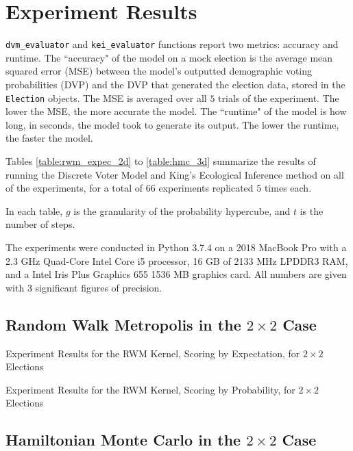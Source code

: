 \FloatBarrier
\section{Experiment Results}
\label{sec:exper_results}

 \texttt{dvm\_evaluator} and \texttt{kei\_evaluator} functions report two metrics: accuracy and runtime. The ``accuracy" of the model on a mock election is the average mean squared error (MSE) between the model's outputted demographic voting probabilities (DVP) and the DVP that generated the election data, stored in the \texttt{Election} objects. The MSE is averaged over all $5$ trials of the experiment. The lower the MSE, the more accurate the model. The ``runtime" of the model is how long, in seconds, the model took to generate its output. The lower the runtime, the faster the model.

Tables \ref{table:rwm_expec_2d} to \ref{table:hmc_3d} summarize the results of running the Discrete Voter Model and King's Ecological Inference method on all of the experiments, for a total of $66$ experiments replicated $5$ times each.

In each table, $g$ is the granularity of the probability hypercube, and $t$ is the number of steps.

The experiments were conducted in Python 3.7.4 on a 2018 MacBook Pro with a 2.3 GHz Quad-Core Intel Core i5 processor, 16 GB of 2133 MHz LPDDR3 RAM, and a Intel Iris Plus Graphics 655 1536 MB graphics card. All numbers are given with $3$ significant figures of precision.

\subsection{Random Walk Metropolis in the $2 \times 2$ Case}

\begin{table}[ht]
  \centering
  \caption{Experiment Results for the RWM Kernel, Scoring by Expectation, for $2 \times 2$ Elections}
  \label{table:rwm_expec_2d}
  
\end{table}


\begin{table}[ht]
  \centering
  \caption{Experiment Results for the RWM Kernel, Scoring by Probability, for $2 \times 2$ Elections}
  \label{table:rwm_prob_2d}
  
\end{table}


\FloatBarrier
\subsection{Hamiltonian Monte Carlo in the $2 \times 2$ Case}


